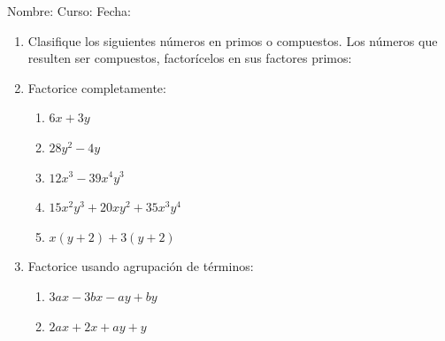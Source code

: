 \documentclass[letterpaper,fleqn]{article}
\newcommand{\LineaNombre}{%
\par
\vspace{\baselineskip}
Nombre:\hrulefill \; Curso: \underline{\hspace*{48pt}} \; Fecha: \underline{\hspace*{2.5cm}} \relax
\par}
\begin{document}
\LineaNombre
\begin{enumerate}
 \item Clasifique los siguientes números en primos o compuestos. Los números que resulten ser compuestos, factorícelos en sus factores primos:
 \begin{enumerate}
 \end{enumerate}
 \item Factorice completamente:
 \begin{enumerate}
 \item $6x+3y$\noanswer
 \item $28y^{2}-4y$\noanswer
 \item $12x^{3}-39x^{4}y^{3}$\noanswer
 \newpage
 \item $15x^{2}y^{3}+20xy^{2}+35x^{3}y^{4}$\noanswer
 \item $x(y+2)+3(y+2)$\noanswer
 \end{enumerate}
 \item Factorice usando agrupación de términos:
 \begin{enumerate}
 \item $3ax-3bx-ay+by$\noanswer
 \item $2ax+2x+ay+y$\noanswer
 \end{enumerate}
 \end{enumerate}
\end{document}

